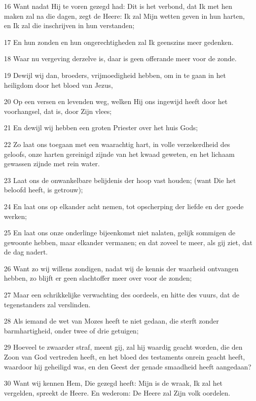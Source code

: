 \par 16 Want nadat Hij te voren gezegd had: Dit is het verbond, dat Ik met hen maken zal na die dagen, zegt de Heere: Ik zal Mijn wetten geven in hun harten, en Ik zal die inschrijven in hun verstanden;
\par 17 En hun zonden en hun ongerechtigheden zal Ik geenszins meer gedenken.
\par 18 Waar nu vergeving derzelve is, daar is geen offerande meer voor de zonde.
\par 19 Dewijl wij dan, broeders, vrijmoedigheid hebben, om in te gaan in het heiligdom door het bloed van Jezus,
\par 20 Op een versen en levenden weg, welken Hij ons ingewijd heeft door het voorhangsel, dat is, door Zijn vlees;
\par 21 En dewijl wij hebben een groten Priester over het huis Gods;
\par 22 Zo laat ons toegaan met een waarachtig hart, in volle verzekerdheid des geloofs, onze harten gereinigd zijnde van het kwaad geweten, en het lichaam gewassen zijnde met rein water.
\par 23 Laat ons de onwankelbare belijdenis der hoop vast houden; (want Die het beloofd heeft, is getrouw);
\par 24 En laat ons op elkander acht nemen, tot opscherping der liefde en der goede werken;
\par 25 En laat ons onze onderlinge bijeenkomst niet nalaten, gelijk sommigen de gewoonte hebben, maar elkander vermanen; en dat zoveel te meer, als gij ziet, dat de dag nadert.
\par 26 Want zo wij willens zondigen, nadat wij de kennis der waarheid ontvangen hebben, zo blijft er geen slachtoffer meer over voor de zonden;
\par 27 Maar een schrikkelijke verwachting des oordeels, en hitte des vuurs, dat de tegenstanders zal verslinden.
\par 28 Als iemand de wet van Mozes heeft te niet gedaan, die sterft zonder barmhartigheid, onder twee of drie getuigen;
\par 29 Hoeveel te zwaarder straf, meent gij, zal hij waardig geacht worden, die den Zoon van God vertreden heeft, en het bloed des testaments onrein geacht heeft, waardoor hij geheiligd was, en den Geest der genade smaadheid heeft aangedaan?
\par 30 Want wij kennen Hem, Die gezegd heeft: Mijn is de wraak, Ik zal het vergelden, spreekt de Heere. En wederom: De Heere zal Zijn volk oordelen.
